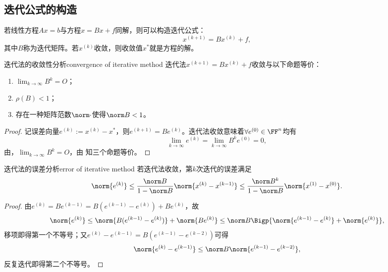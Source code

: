 \subsection{迭代公式的构造}

若线性方程$Ax=b$与方程$x=Bx+f$同解，则可以构造迭代公式：
\begin{equation}
    x^{(k+1)}=Bx^{(k)}+f,
\end{equation}
其中$B$称为迭代矩阵。若$x^{(k)}$收敛，则收敛值$x^*$就是方程的解。

\begin{theorem}
    {迭代法的收敛性分析}{convergence of iterative method}
    迭代法$x^{(k+1)}=Bx^{(k)}+f$收敛与以下命题等价：
    \begin{enumerate}
        \item $\lim_{k\to\infty}B^k=O$；
        \item $\rho(B)<1$；
        \item 存在一种矩阵范数$\norm\cdot$使得$\norm B<1$。
    \end{enumerate}
\end{theorem}

\begin{proof}
    记误差向量$e^{(k)}:=x^{(k)}-x^*$，则$e^{(k+1)}=Be^{(k)}$。迭代法收敛意味着$\forall e^{(0)}\in\FF^n$均有
    \[
        \lim_{k\to\infty}e^{(k)}=\lim_{k\to\infty}B^ke^{(0)}=0,
    \]
    由，$\lim_{k\to\infty}B^k=O$，由 知三个命题等价。
\end{proof}

\begin{theorem}
    {迭代法的误差分析}{error of iterative method}
    若迭代法收敛，第$k$次迭代的误差满足
    \begin{equation}
        \norm{e^{(k)}}\leq\frac{\norm B}{1-\norm B}\norm{x^{(k)}-x^{(k-1)}}\leq\frac{\norm B^k}{1-\norm B}\norm{x^{(1)}-x^{(0)}}.
    \end{equation}
\end{theorem}

\begin{proof}
    由$e^{(k)}=Be^{(k-1)}=B(e^{(k-1)}-e^{(k)})+Be^{(k)}$，故
    \[
        \norm{e^{(k)}}\leq\norm{B(e^{(k-1)}-e^{(k)})}+\norm{Be^{(k)}}\leq\norm B\Bigp{\norm{e^{(k-1)}-e^{(k)}}+\norm{e^{(k)}}},
    \]
    移项即得第一个不等号；又$e^{(k)}-e^{(k-1)}=B(e^{(k-1)}-e^{(k-2)})$可得 
    \[
        \norm{e^{(k)}-e^{(k-1)}}\leq\norm B\norm{e^{(k-1)}-e^{(k-2)}},
    \]
    反复迭代即得第二个不等号。
\end{proof}

